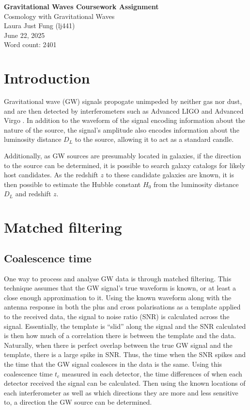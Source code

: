 \documentclass[11pt,a4paper]{article}
\begin{document}
 

\begin{center}
    \LARGE{\textbf{Gravitational Waves Coursework Assignment}}
    \\
    \Large{{Cosmology with Gravitational Waves}}
    \\
    \large{Laura Just Fung (lj441)}
    \\
    June 22, 2025
    \\
    Word count: 2401
\end{center}
\section{Introduction}
\label{sec:intro}
Gravitational wave (GW) signals propogate unimpeded by neither gas nor dust, and are then detected by interferometers such as Advanced LIGO \citep{LIGO2015} and Advanced Virgo \citep{Acernese_2014}. In addition to the waveform of the signal encoding information about the nature of the source, the signal's amplitude also encodes information about the luminosity distance $D_L$ to the source, allowing it to act as a standard candle.

Additionally, as GW sources are presumably located in galaxies, if the direction to the source can be determined, it is possible to search galaxy catalogs for likely host candidates. As the redshift $z$ to these candidate galaxies are known, it is then possible to estimate the Hubble constant $H_0$ from the luminosity distance $D_L$ and redshift $z$.

\section{Matched filtering}
\label{sec:matched_filtering}
\subsection{Coalescence time}
\label{sec:tc}
One way to process and analyse GW data is through matched filtering. This technique assumes that the GW signal's true waveform is known, or at least a close enough approximation to it. Using the known waveform along with the antenna response in both the plus and cross polarisations as a template applied to the received data, the signal to noise ratio (SNR) is calculated across the signal. Essentially, the template is ``slid'' along the signal and the SNR calculated is then how much of a correlation there is between the template and the data. Naturally, when there is perfect overlap between the true GW signal and the template, there is a large spike in SNR. Thus, the time when the SNR spikes and the time that the GW signal coalesces in the data is the same. Using this coalescence time $t_c$ measured in each detector, the time differences of when each detector received the signal can be calculated. Then using the known locations of each interferometer as well as which directions they are more and less sensitive to, a direction the GW source can be determined. 
\end{document}
